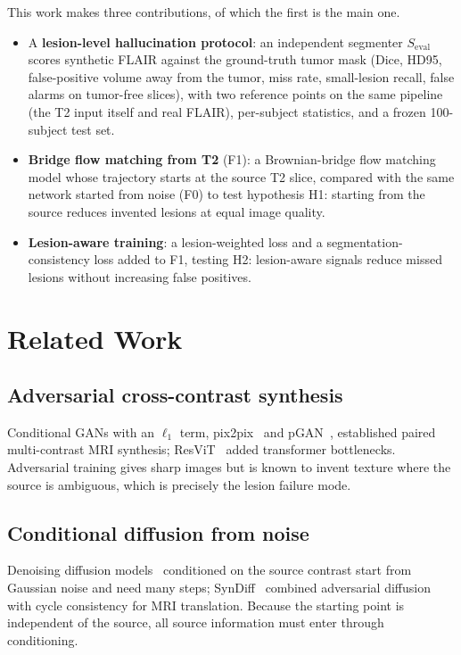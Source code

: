 \documentclass[journal]{IEEEtran}
\newcommand{\Seval}{S_{\mathrm{eval}}}
\begin{document}
This work makes three contributions, of which the first is the main one.
\begin{itemize}
\item A \textbf{lesion-level hallucination protocol}: an independent segmenter $\Seval$ scores synthetic FLAIR against the
ground-truth tumor mask (Dice, HD95, false-positive volume away from the tumor, miss rate, small-lesion recall, false alarms
on tumor-free slices), with two reference points on the same pipeline (the T2 input itself and real FLAIR), per-subject
statistics, and a frozen 100-subject test set.
\item \textbf{Bridge flow matching from T2} (F1): a Brownian-bridge flow matching model whose trajectory starts at the
source T2 slice, compared with the same network started from noise (F0) to test hypothesis H1: starting from the source
reduces invented lesions at equal image quality.
\item \textbf{Lesion-aware training}: a lesion-weighted loss and a segmentation-consistency loss added to F1, testing H2:
lesion-aware signals reduce missed lesions without increasing false positives.
\end{itemize}

\section{Related Work}
\subsection{Adversarial cross-contrast synthesis}
Conditional GANs with an $\ell_1$ term, pix2pix~\cite{isola2017pix2pix} and pGAN~\cite{dar2019pgan}, established paired
multi-contrast MRI synthesis; ResViT~\cite{dalmaz2022resvit} added transformer bottlenecks. Adversarial training gives
sharp images but is known to invent texture where the source is ambiguous, which is precisely the lesion failure mode.

\subsection{Conditional diffusion from noise}
Denoising diffusion models~\cite{ho2020ddpm,dhariwal2021adm} conditioned on the source contrast start from Gaussian noise and
need many steps; SynDiff~\cite{ozbey2023syndiff} combined adversarial diffusion with cycle consistency for MRI translation.
Because the starting point is independent of the source, all source information must enter through conditioning.
\end{document}
